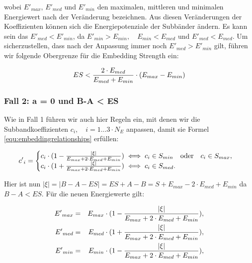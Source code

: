 wobei ${E'}_{max}$, ${E'}_{med}$ und ${E'}_{min}$ den maximalen, mittleren und minimalen Energiewert nach der Veränderung bezeichnen. Aus diesen Veränderungen der Koeffizienten können sich die Energiepotenziale der Subbänder ändern. Es kann sein das ${E'}_{med} < {E'}_{min}$, da ${E'}_{min}>{E}_{min},\quad {E}_{min}<{E}_{med}$ und ${E'}_{med}<{E}_{med}$. Um sicherzustellen, dass nach der Anpassung immer noch ${E'}_{med} > {E'}_{min}$ gilt, führen wir folgende Obergrenze für die Embedding Strength ein:

	\begin{equation}
		ES < { 2 \cdot {E}_{med} \over {E}_{med} + {E}_{min} } \cdot ( {E}_{max} - {E}_{min} )
		\label{equ:embeddingstrengthconstraint_case1}
	\end{equation}

\subsubsection{Fall 2: a = 0 und B-A < ES}

Wie in Fall 1 führen wir auch hier Regeln ein, mit denen wir die Subbandkoeffizienten ${c}_{i},\quad i=1\dots{3\cdot{N}_{E}}$ anpassen, damit sie Formel \ref{equ:embeddingrelationships} erfüllen:

	 \begin{equation}
		 {c'}_{i} = \begin{cases}
    	 				{c}_{i} \cdot ( 1 - { |\xi| \over {{E}_{max} + 2\cdot {E}_{med} + {E}_{min}} }) \iff {c}_{i} \in {S}_{min} \quad\mbox{oder}\quad {c}_{i} \in {S}_{max}, 
						\\
    					{c}_{i} \cdot ( 1 + { |\xi| \over {{E}_{max} + 2\cdot {E}_{med} + {E}_{min}} }) \iff {c}_{i} \in {S}_{med}.
  				  	\end{cases}
		  \label{equ:modifcoef_case2}
	 \end{equation}
	 
Hier ist nun  $|\xi| = |B-A-ES| = ES+A-B = S + {E}_{max} - 2\cdot {E}_{med} + {E}_{min}$ da $B-A<ES$. Für die neuen Energiewerte gilt:

	 \begin{eqnarray*}
		 {E'}_{max} & = & {E}_{max} \cdot (1 - { |\xi| \over {{E}_{max} + 2\cdot {E}_{med} + {E}_{min}} }),
		 \\ 
		 {E'}_{med} & = & {E}_{med} \cdot (1 + { |\xi| \over {{E}_{max} + 2\cdot {E}_{med} + {E}_{min}} }),
		 \\
		 {E'}_{min} & = & {E}_{min} \cdot (1 - { |\xi| \over {{E}_{max} + 2\cdot {E}_{med} + {E}_{min}} }),
	\end{eqnarray*}
	
